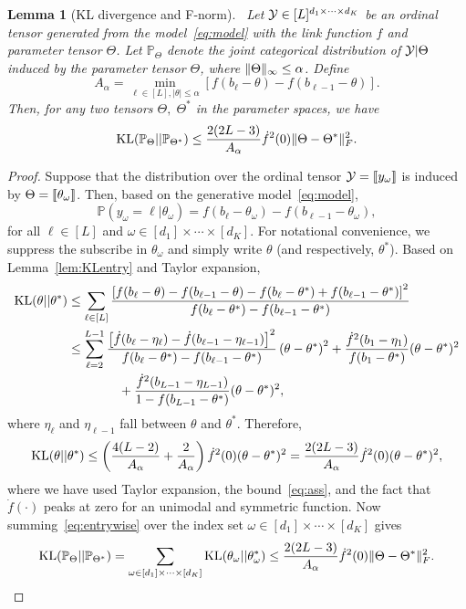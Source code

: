\documentclass{article}
\theoremstyle{plain}
\newtheorem{lem}{Lemma}
\theoremstyle{definition}
\begin{document}
\begin{lem}[KL divergence and F-norm]~\label{lem:KL}
Let $\mathcal{Y}\in[L]^{d_1\times \cdots \times d_K}$ be an ordinal tensor generated from the model~\eqref{eq:model} with the link function $f$ and parameter tensor $\Theta$. Let $\mathbb{P}_{\Theta}$ denote the joint categorical distribution of $\mathcal{Y}|\Theta$ induced by the parameter tensor $\Theta$, where $\lVert\Theta\rVert_\infty\leq \alpha$. Define
\begin{equation}\label{eq:ass}
A_\alpha=\min_{\ell\in[L], |\theta|\leq \alpha}\left[f(b_\ell-\theta)-f(b_{\ell-1}-\theta)\right].
\end{equation}
Then, for any two tensors $\Theta,\; \Theta^*$ in the parameter spaces, we have
\[
\mathrm{KL}(\mathbb{P}_{\Theta}|| \mathbb{P}_{\Theta^*})\leq {2(2L-3)\over A_\alpha} \dot{f}^2(0)\lVert\Theta-\Theta^*\rVert_F^2.
\]
\end{lem}
\begin{proof} Suppose that the distribution over the ordinal tensor $\mathcal{Y}=\llbracket y_\omega \rrbracket$ is induced by $\Theta=\llbracket \theta_\omega \rrbracket$. Then, based on the generative model~\eqref{eq:model},
\[
\mathbb{P}(y_\omega=\ell | \theta_\omega)=f(b_{\ell}-\theta_\omega)-f(b_{\ell-1}-\theta_\omega),
\]
for all $\ell\in[L]$ and $\omega\in[d_1]\times \cdots \times [d_K]$. For notational convenience, we suppress the subscribe in $\theta_\omega$ and simply write $\theta$ (and respectively, $\theta^*$). Based on Lemma~\ref{lem:KLentry} and Taylor expansion,
\begin{align}
\text{KL}(\theta|| \theta^*) & \leq \sum_{\ell\in[L]} {\left[f(b_{\ell}-\theta)-f(b_{\ell-1}-\theta)-f(b_{\ell}-\theta^*)+f(b_{\ell-1}-\theta^*)\right]^2\over f(b_{\ell}-\theta^*)-f(b_{\ell-1}-\theta^*)}\\
 &\leq \sum_{\ell=2}^{L-1} {\left[\dot{f}(b_\ell-\eta_\ell)-\dot{f}(b_{\ell-1}-\eta_{\ell-1})\right]^2 \over f(b_\ell-\theta^*)-f(b_{\ell-1}-\theta^*)} \left(\theta-\theta^*\right)^2+{\dot{f}^2(b_1-\eta_1) \over f(b_1-\theta^*)} (\theta-\theta^*)^2\\
 &\quad \quad\quad \quad  +{\dot{f}^2(b_{L-1}-\eta_{L-1})\over 1-f(b_{L-1}-\theta^*)}(\theta-\theta^*)^2,
\end{align}
where $\eta_\ell$ and $\eta_{\ell-1}$ fall between $\theta$ and $\theta^*$. Therefore,
\begin{equation}\label{eq:entrywise}
\text{KL}(\theta|| \theta^*) \leq \left({4(L-2)\over A_\alpha}+ {2\over A_\alpha}\right)\dot{f}^2(0)(\theta-\theta^*)^2={2(2L-3)\over A_\alpha} \dot{f}^2(0)(\theta-\theta^*)^2,
\end{equation}
where we have used Taylor expansion, the bound~\eqref{eq:ass}, and the fact that $\dot{f}(\cdot)$ peaks at zero for an unimodal and symmetric function. Now summing~\eqref{eq:entrywise} over the index set $\omega\in[d_1]\times \cdots \times [d_K]$ gives
\[
\text{KL}(\mathbb{P}_{\Theta}|| \mathbb{P}_{\Theta^*}) =\sum_{\omega\in[d_1]\times \cdots \times[d_K]} \text{KL}(\theta_\omega || \theta^*_\omega) \leq {2(2L-3)\over A_\alpha} \dot{f}^2(0)\lVert\Theta-\Theta^*\rVert_F^2.
\]
\end{proof}
\end{document}
